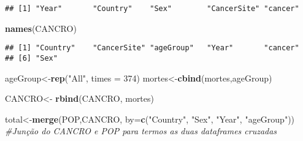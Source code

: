 \documentclass[
]{article}
\newenvironment{Shaded}{\begin{snugshade}}{\end{snugshade}}
\newcommand{\CommentTok}[1]{\textcolor[rgb]{0.56,0.35,0.01}{\textit{#1}}}
\newcommand{\DataTypeTok}[1]{\textcolor[rgb]{0.13,0.29,0.53}{#1}}
\newcommand{\DecValTok}[1]{\textcolor[rgb]{0.00,0.00,0.81}{#1}}
\newcommand{\KeywordTok}[1]{\textcolor[rgb]{0.13,0.29,0.53}{\textbf{#1}}}
\newcommand{\NormalTok}[1]{#1}
\newcommand{\OperatorTok}[1]{\textcolor[rgb]{0.81,0.36,0.00}{\textbf{#1}}}
\newcommand{\StringTok}[1]{\textcolor[rgb]{0.31,0.60,0.02}{#1}}
\begin{document}
\begin{Shaded}
\end{Shaded}

\begin{verbatim}
## [1] "Year"       "Country"    "Sex"        "CancerSite" "cancer"
\end{verbatim}

\begin{Shaded}
\begin{Highlighting}[]
\KeywordTok{names}\NormalTok{(CANCRO)}
\end{Highlighting}
\end{Shaded}

\begin{verbatim}
## [1] "Country"    "CancerSite" "ageGroup"   "Year"       "cancer"    
## [6] "Sex"
\end{verbatim}

\begin{Shaded}
\begin{Highlighting}[]
\NormalTok{ageGroup<-}\KeywordTok{rep}\NormalTok{(}\StringTok{"All"}\NormalTok{, }\DataTypeTok{times =} \DecValTok{374}\NormalTok{)}
\NormalTok{mortes<-}\KeywordTok{cbind}\NormalTok{(mortes,ageGroup)}

\NormalTok{CANCRO<-}\StringTok{ }\KeywordTok{rbind}\NormalTok{(CANCRO, mortes)}
\end{Highlighting}
\end{Shaded}

\begin{Shaded}
\begin{Highlighting}[]
\NormalTok{total<-}\KeywordTok{merge}\NormalTok{(POP,CANCRO, }\DataTypeTok{by=}\KeywordTok{c}\NormalTok{(}\StringTok{"Country"}\NormalTok{, }\StringTok{"Sex"}\NormalTok{, }\StringTok{"Year"}\NormalTok{, }\StringTok{"ageGroup"}\NormalTok{))}
\CommentTok{#Junção do CANCRO e POP para termos as duas dataframes cruzadas}
\end{Highlighting}
\end{Shaded}
\end{document}

